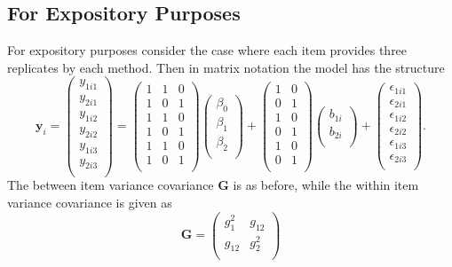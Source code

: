 \documentclass[12pt, a4paper]{article}
\begin{document}
\subsection{For Expository Purposes}



For expository purposes consider the case where each item provides three replicates by each method. Then in matrix notation the model has the structure
\[
\boldsymbol{y}_{i} =
\left(
\begin{array}{c}
y_{1i1} \\
y_{2i1} \\
y_{1i2} \\
y_{2i2} \\
y_{1i3} \\
y_{2i3} \\
\end{array}
\right) = 
\left(
\begin{array}{ccc}
1 & 1 & 0 \\
1 & 0 & 1 \\
1 & 1 & 0 \\
1 & 0 & 1 \\
1 & 1 & 0 \\
1 & 0 & 1 \\
\end{array}
\right)
\left(
\begin{array}{c}
\beta_0 \\ \beta_1 \\ \beta_2 \\
\end{array}
\right)
+
\left(
\begin{array}{cc}
1 & 0 \\
0 & 1 \\
1 & 0 \\
0 & 1 \\
1 & 0 \\
0 & 1 \\
\end{array}
\right)\left(
\begin{array}{c}
b_{1i} \\   b_{2i} \\
\end{array}
\right)
+
\left(
\begin{array}{c}
\epsilon_{1i1} \\
\epsilon_{2i1} \\
\epsilon_{1i2} \\
\epsilon_{2i2} \\
\epsilon_{1i3} \\
\epsilon_{2i3} \\
\end{array}
\right).
\]
The between item variance covariance $\boldsymbol{G}$ is as before, while the within item variance covariance is given as
\[ \boldsymbol{G} =\left(
\begin{array}{cc}
g^2_1  & g_{12} \\
g_{12} & g^2_2 \\
\end{array}
\right) \]
\end{document}
